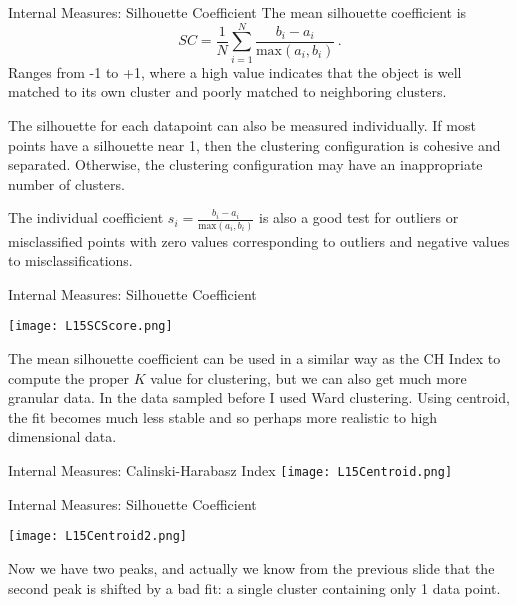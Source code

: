 \documentclass[10pt, table, dvipsnames,xcdraw,handout]{beamer}
\begin{document}
\begin{frame}[fragile]{Internal Measures: Silhouette Coefficient}
The mean silhouette coefficient is
$$
SC = \frac{1}{N}\sum_{i=1}^N \frac{b_i - a_i}{\text{max}(a_i,b_i)}\,.
$$
Ranges from -1 to +1, where a high value indicates that the object is well matched to its own cluster and poorly matched to neighboring clusters.\pause

The silhouette for each datapoint can also be measured individually. If most points have a silhouette near 1, then the clustering configuration is cohesive and separated. Otherwise, the clustering configuration may have an inappropriate number of clusters. \pause

The individual coefficient $s_i = \frac{b_i - a_i}{\text{max}(a_i,b_i)}$ is also a good test for outliers or misclassified points with zero values corresponding to outliers and negative values to misclassifications.
\end{frame}


\begin{frame}[fragile]{Internal Measures: Silhouette Coefficient}
 \begin{minipage}[t][0.5\textheight][t]{\textwidth}
	\centering \texttt{[image: L15SCScore.png]} 
  \end{minipage}
  \vfill
\begin{minipage}[t][0.5\textheight][t]{\textwidth}
The mean silhouette coefficient can be used in a similar way as the CH Index to compute the proper $K$ value for clustering, but we can also get much more granular data. In the data sampled before I used Ward clustering. Using centroid, the fit becomes much less stable and so perhaps more realistic to high dimensional data.
\end{minipage}
\end{frame}


\begin{frame}[fragile]{Internal Measures: Calinski-Harabasz Index}
	\centering \texttt{[image: L15Centroid.png]} 
\end{frame}




\begin{frame}[fragile]{Internal Measures: Silhouette Coefficient}
 \begin{minipage}[t][0.5\textheight][t]{\textwidth}
	\centering \texttt{[image: L15Centroid2.png]} 
  \end{minipage}
  \vfill
\begin{minipage}[t][0.5\textheight][t]{\textwidth}
Now we have two peaks, and actually we know from the previous slide that the second peak is shifted by a bad fit: a single cluster containing only 1 data point. 
\end{minipage}
\end{frame}
\end{document}
